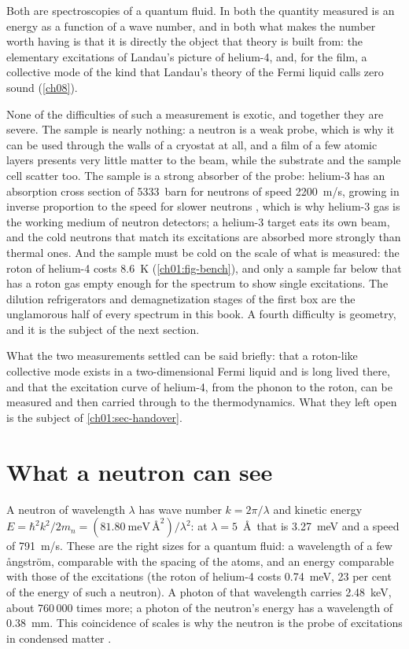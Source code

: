 Both are spectroscopies of a quantum fluid. In both the quantity measured is an energy as a function of a wave number, and in both what makes the number worth having is that it is directly the object that theory is built from: the elementary excitations of Landau's picture of helium-4, and, for the film, a collective mode of the kind that Landau's theory of the Fermi liquid calls zero sound (\cref{ch08}).

None of the difficulties of such a measurement is exotic, and together they are severe. The sample is nearly nothing: a neutron is a weak probe, which is why it can be used through the walls of a cryostat at all, and a film of a few atomic layers presents very little matter to the beam, while the substrate and the sample cell scatter too. The sample is a strong absorber of the probe: helium-3 has an absorption cross section of 5333~barn for neutrons of speed 2200~m/s, growing in inverse proportion to the speed for slower neutrons \cite{Sears1992}, which is why helium-3 gas is the working medium of neutron detectors; a helium-3 target eats its own beam, and the cold neutrons that match its excitations are absorbed more strongly than thermal ones. And the sample must be cold on the scale of what is measured: the roton of helium-4 costs 8.6~K (\cref{ch01:fig-bench}), and only a sample far below that has a roton gas empty enough for the spectrum to show single excitations. The dilution refrigerators and demagnetization stages of the first box are the unglamorous half of every spectrum in this book. A fourth difficulty is geometry, and it is the subject of the next section.

What the two measurements settled can be said briefly: that a roton-like collective mode exists in a two-dimensional Fermi liquid and is long lived there, and that the excitation curve of helium-4, from the phonon to the roton, can be measured and then carried through to the thermodynamics. What they left open is the subject of \cref{ch01:sec-handover}.

\section{What a neutron can see}\label{ch01:sec-neutron}

A neutron of wavelength $\lambda$ has wave number $k=2\pi/\lambda$ and kinetic energy $E=\hbar^2k^2/2m_n=(81.80\ \mathrm{meV\,\text{\AA}^2})/\lambda^2$: at $\lambda=5$~\AA\ that is 3.27~meV and a speed of 791~m/s. These are the right sizes for a quantum fluid: a wavelength of a few ångström, comparable with the spacing of the atoms, and an energy comparable with those of the excitations (the roton of helium-4 costs 0.74~meV, 23 per cent of the energy of such a neutron). A photon of that wavelength carries 2.48~keV, about 760\,000 times more; a photon of the neutron's energy has a wavelength of 0.38~mm. This coincidence of scales is why the neutron is the probe of excitations in condensed matter \cite{Squires2012,Glyde1994}.

